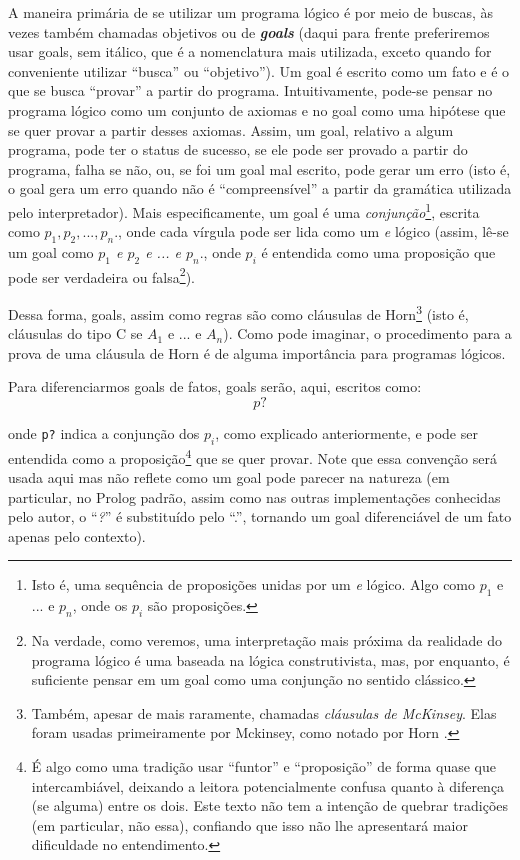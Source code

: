 \documentclass{article}
\begin{document}
A maneira primária de se utilizar um programa lógico é por meio de buscas, às vezes também chamadas objetivos ou de \textbf{\textit{goals}} (daqui para frente preferiremos usar goals, sem itálico, que é a nomenclatura mais utilizada, exceto quando for conveniente utilizar ``busca'' ou ``objetivo''). Um goal é escrito como um fato e é o que se busca ``provar'' a partir do programa. Intuitivamente, pode-se pensar no programa lógico como um conjunto de axiomas e no goal como uma hipótese que se quer provar a partir desses axiomas. Assim, um
goal, relativo a algum programa, pode ter o status de sucesso, se ele pode ser provado a partir do programa, falha se não, ou, se foi um goal mal escrito, pode gerar um erro (isto é, o goal gera um erro quando não é ``compreensível'' a partir da gramática utilizada pelo interpretador). Mais especificamente, um goal é uma \textit{conjunção}\footnote{Isto é, uma sequência de proposições unidas por um \textit{e} lógico. Algo como $p_1$ e
  ... e $p_n$, onde os $p_i$ são proposições.}, escrita como \textit{$p_1,p_2,...,p_n.$}, onde cada vírgula pode ser lida como um \textit{e} lógico (assim, lê-se um goal como \textit{$p_1$ e $p_2$ e ... e
  $p_n.$}, onde $p_i$ é
entendida como uma proposição que pode ser verdadeira ou falsa\footnote{Na verdade, como veremos, uma interpretação mais próxima da realidade do programa lógico é uma baseada na lógica construtivista, mas, por enquanto, é suficiente pensar em um goal como uma conjunção no sentido clássico.}).

Dessa forma, goals, assim como regras são como cláusulas de Horn\footnote{Também, apesar de mais raramente, chamadas \textit{cláusulas de McKinsey}. Elas foram usadas primeiramente por Mckinsey, como notado por Horn \cite{horn}.} (isto é, cláusulas do tipo C se $A_1$ e ... e $A_n$). Como pode imaginar, o procedimento para a prova de uma cláusula de Horn é de alguma importância para programas lógicos.

Para diferenciarmos goals de fatos, goals serão, aqui, escritos como:
\[
  p?
\]

\noindent onde {\tt p?} indica a conjunção dos $p_i$, como explicado anteriormente, e pode ser entendida como a proposição\footnote{É algo como uma tradição usar ``funtor'' e ``proposição'' de forma quase que intercambiável, deixando a leitora potencialmente confusa quanto à diferença (se alguma) entre os dois. Este texto não tem a intenção de quebrar tradições (em particular, não essa), confiando que isso não lhe apresentará maior dificuldade no entendimento.} que se quer provar. Note que essa convenção será usada aqui mas não reflete como um goal pode parecer na natureza (em particular, no
Prolog padrão, assim como nas outras implementações conhecidas pelo autor, o ``\textit{?}'' é substituído pelo ``.'', tornando um goal diferenciável de um fato apenas pelo contexto).
\end{document}
